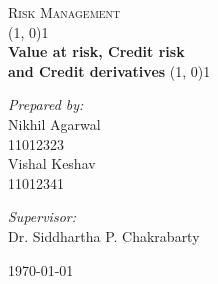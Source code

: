 \begin{titlepage}

\begin{center}

\textsc{\LARGE Risk Management}\\[2.5cm]

\linethickness{0.5mm}
\line(1, 0){1\linewidth} \\[0.4cm]
{\huge \bfseries Value at risk, Credit risk} \\[0.4cm]
{\huge \bfseries and Credit derivatives}
\line(1, 0){1\linewidth} \\[2.5cm]

\begin{minipage}[t]{0.4\textwidth}
	\begin{flushleft} \large
	\emph{Prepared by:} \\[0.3cm]
	Nikhil Agarwal \\
	{\small 11012323} \\[0.2cm]
	Vishal Keshav \\
	{\small 11012341} \\[0.2cm]
	\end{flushleft}
\end{minipage}
\begin{minipage}[t]{0.4\textwidth}
	\begin{flushright} \large
	\emph{Supervisor:} \\[0.3cm]
	Dr. Siddhartha P. Chakrabarty 
	\end{flushright}
\end{minipage}

\vfill

{\large \today}

\end{center}

\end{titlepage}